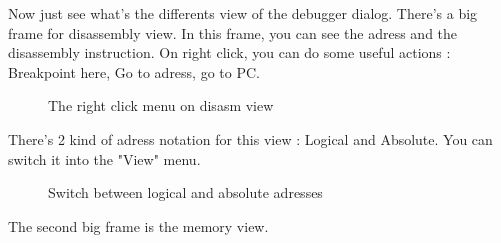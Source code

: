 \documentclass[10pt]{report}
\begin{document}
Now just see what's the differents view of the debugger dialog.\newline
There's a big frame for disassembly view.\newline
In this frame, you can see the adress and the disassembly instruction.\newline
On right click, you can do some useful actions : Breakpoint here, Go to adress, go to PC.\newline
\begin{figure}[H]
\centering
{}
\caption{The right click menu on disasm view}
\end{figure}

There's 2 kind of adress notation for this view : Logical and Absolute.\newline 
You can switch it into the "View" menu.\newline

\begin{figure}[H]
\centering
{}
\caption{Switch between logical and absolute adresses}
\end{figure}
The second big frame is the memory view.\newline
\end{document}
